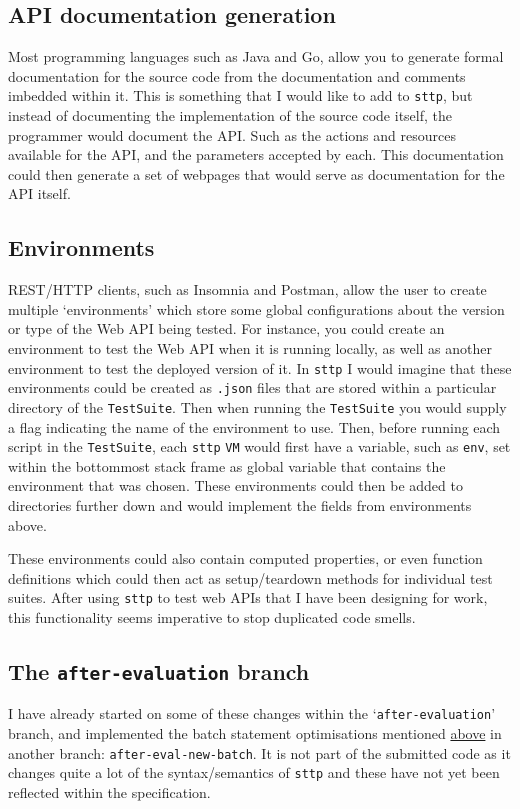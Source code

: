 \cprotect\subsection{API documentation generation}

Most programming languages such as Java and Go, allow you to generate formal documentation for the source code from the documentation and comments imbedded within it. This is something that I would like to add to \verb|sttp|, but instead of documenting the implementation of the source code itself, the programmer would document the API. Such as the actions and resources available for the API, and the parameters accepted by each. This documentation could then generate a set of webpages that would serve as documentation for the API itself.

\cprotect\subsection{Environments}

REST/HTTP clients, such as Insomnia and Postman, allow the user to create multiple `environments' which store some global configurations about the version or type of the Web API being tested. For instance, you could create an environment to test the Web API when it is running locally, as well as another environment to test the deployed version of it. In \verb|sttp| I would imagine that these environments could be created as \verb|.json| files that are stored within a particular directory of the \verb|TestSuite|. Then when running the \verb|TestSuite| you would supply a flag indicating the name of the environment to use. Then, before running each script in the \verb|TestSuite|, each \verb|sttp| \verb|VM| would first have a variable, such as \verb|env|, set within the bottommost stack frame as global variable that contains the environment that was chosen. These environments could then be added to directories further down and would implement the fields from environments above.

These environments could also contain computed properties, or even function definitions which could then act as setup/teardown methods for individual test suites. After using \verb|sttp| to test web APIs that I have been designing for work, this functionality seems imperative to stop duplicated code smells.

\cprotect\subsection{The \verb|after-evaluation| branch}

I have already started on some of these changes within the `\verb|after-evaluation|' branch, and implemented the batch statement optimisations mentioned \hyperref[sec:evaluation-batch-optimisation]{above} in another branch: \verb|after-eval-new-batch|. It is not part of the submitted code as it changes quite a lot of the syntax/semantics of \verb|sttp| and these have not yet been reflected within the specification.
